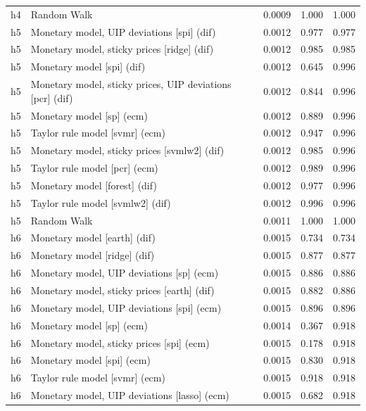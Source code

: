 \begin{ThreePartTable}
\begin{longtable}[t]{cp{5.5cm}ccc}
h4 & \raggedright Random Walk & 0.0009 & 1.000 & 1.000\\
\addlinespace
h5 & \raggedright Monetary model, UIP deviations [spi] (dif) & 0.0012 & 0.977 & 0.977\\
h5 & \raggedright Monetary model, sticky prices [ridge] (dif) & 0.0012 & 0.985 & 0.985\\
h5 & \raggedright Monetary model [spi] (dif) & 0.0012 & 0.645 & 0.996\\
h5 & \raggedright Monetary model, sticky prices, UIP deviations [pcr] (dif) & 0.0012 & 0.844 & 0.996\\
h5 & \raggedright Monetary model [sp] (ecm) & 0.0012 & 0.889 & 0.996\\
h5 & \raggedright Taylor rule model [svmr] (ecm) & 0.0012 & 0.947 & 0.996\\
h5 & \raggedright Monetary model, sticky prices [svmlw2] (dif) & 0.0012 & 0.985 & 0.996\\
h5 & \raggedright Taylor rule model [pcr] (ecm) & 0.0012 & 0.989 & 0.996\\
h5 & \raggedright Monetary model [forest] (dif) & 0.0012 & 0.977 & 0.996\\
h5 & \raggedright Taylor rule model [svmlw2] (dif) & 0.0012 & 0.996 & 0.996\\
h5 & \raggedright Random Walk & 0.0011 & 1.000 & 1.000\\
\addlinespace
h6 & \raggedright Monetary model [earth] (dif) & 0.0015 & 0.734 & 0.734\\
h6 & \raggedright Monetary model [ridge] (dif) & 0.0015 & 0.877 & 0.877\\
h6 & \raggedright Monetary model, UIP deviations [sp] (ecm) & 0.0015 & 0.886 & 0.886\\
h6 & \raggedright Monetary model, sticky prices [earth] (dif) & 0.0015 & 0.882 & 0.886\\
h6 & \raggedright Monetary model, UIP deviations [spi] (ecm) & 0.0015 & 0.896 & 0.896\\
h6 & \raggedright Monetary model [sp] (ecm) & 0.0014 & 0.367 & 0.918\\
h6 & \raggedright Monetary model, sticky prices [spi] (ecm) & 0.0015 & 0.178 & 0.918\\
h6 & \raggedright Monetary model [spi] (ecm) & 0.0015 & 0.830 & 0.918\\
h6 & \raggedright Taylor rule model [svmr] (ecm) & 0.0015 & 0.918 & 0.918\\
h6 & \raggedright Monetary model, UIP deviations [lasso] (ecm) & 0.0015 & 0.682 & 0.918\\

\end{longtable}
\end{ThreePartTable}
